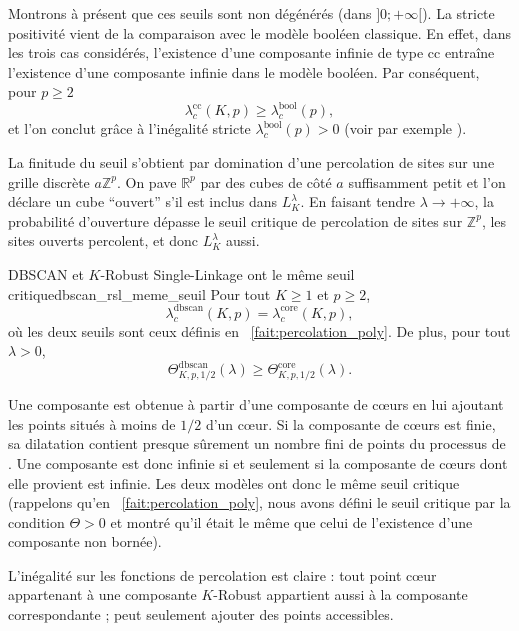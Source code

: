 \begin{Preuve}
Montrons à présent que ces seuils sont non dégénérés (dans $]0 ; + \infty[$). La stricte positivité vient de la comparaison avec le modèle booléen classique. En effet, dans les trois cas considérés, l'existence d'une composante infinie de type $\mathrm{cc}$ entraîne l'existence d'une composante infinie dans le modèle booléen. Par conséquent, pour $p\ge 2$
\[
\lambda^{\mathrm{cc}}_{c}(K,p)
\geq
\lambda^{\mathrm{bool}}_{c}(p),
\]
et l'on conclut grâce à l'inégalité stricte $\lambda^{\mathrm{bool}}_{c}(p)>0$ (voir par exemple \cite{penrose2003,MeesterRoy}).

La finitude du seuil s'obtient par domination d'une percolation de sites \cite{Percolation2006} sur une grille discrète $a \mathbb Z^p$. On pave $\mathbb R^p$ par des cubes de côté $a$ suffisamment petit et l’on déclare un cube ``ouvert'' s'il est inclus dans $L_K^\lambda$. En faisant tendre $\lambda \to +\infty$, la probabilité d’ouverture dépasse le seuil critique de percolation de sites sur $\mathbb Z^p$, les sites ouverts percolent, et donc $L_K^\lambda$ aussi.

\end{Preuve}

\begin{Fait}{DBSCAN et $K$-Robust Single-Linkage ont le même seuil critique}{dbscan_rsl_meme_seuil}
Pour tout $K\geq 1$ et $p\geq 2$,
\[
\boxed{
\lambda^{\mathrm{dbscan}}_{c}(K,p)
=
\lambda^{\mathrm{core}}_{c}(K,p),
}
\]
où les deux seuils sont ceux définis en \Fact~\ref{fait:percolation_poly}. 
De plus, pour tout $\lambda>0$,
\[
\Theta^{\mathrm{dbscan}}_{K,p,1/2}(\lambda)
\geq
\Theta^{\mathrm{core}}_{K,p,1/2}(\lambda).
\]
\end{Fait}

\begin{Preuve}
Une composante \DBSCAN est obtenue à partir d'une composante de cœurs en lui ajoutant les points situés à moins de $1/2$ d'un cœur. Si la composante de cœurs est finie, sa dilatation contient presque sûrement un nombre fini de points du processus de . Une composante \DBSCAN est donc infinie si et seulement si la composante de cœurs dont elle provient est infinie. Les deux modèles ont donc le même seuil critique (rappelons qu'en \Fact~\ref{fait:percolation_poly}, nous avons défini le seuil critique par la condition $\Theta>0$ et montré qu'il était le même que celui de l'existence d'une composante non bornée).

L'inégalité sur les fonctions de percolation est claire : tout point cœur appartenant à une composante $K$-Robust appartient aussi à la composante \DBSCAN correspondante ; \DBSCAN peut seulement ajouter des points accessibles.
\end{Preuve}


